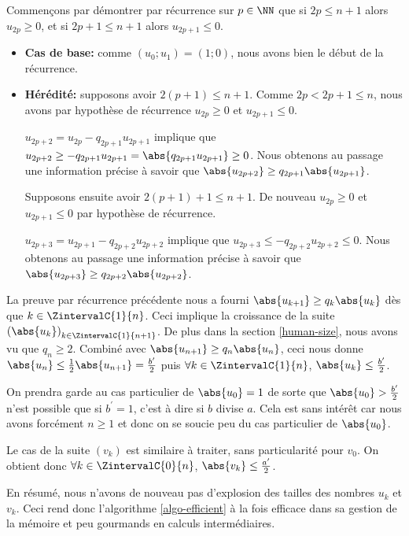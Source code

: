 \medskip


Commençons par démontrer par récurrence sur $p \in \NN$ que si $2p \leq n+1$ alors $u_{2p} \geq 0$, et si $2p + 1 \leq n+1$ alors $u_{2p+1} \leq 0$.

\begin{itemize}[label = \small\textbullet]
	\item \textbf{Cas de base:} comme $(u_0 ; u_1) = (1 ; 0)$, nous avons bien le début de la récurrence.


	\item  \textbf{Hérédité:} supposons avoir $2(p+1) \leq n+1$. Comme $2p < 2p + 1 \leq n$, nous avons par hypothèse de récurrence $u_{2p} \geq 0$ et $u_{2p+1} \leq 0$.
	
	\noindent
	$u_{2p+2} = u_{2p} - q_{2p+1} u_{2p+1}$ implique que 
	$u_{2p+2} \geq - q_{2p+1} u_{2p+1} = \abs{q_{2p+1} u_{2p+1}} \geq 0$.
	Nous obtenons au passage une information précise à savoir que $\abs{u_{2p+2}} \geq q_{2p+1} \abs{u_{2p+1}}$.
	
	
	\medskip
	\noindent
	Supposons ensuite avoir $2(p+1) + 1 \leq n+1$. De nouveau $u_{2p} \geq 0$ et $u_{2p+1} \leq 0$ par hypothèse de récurrence.
	
	\noindent
	$u_{2p+3} = u_{2p+1} - q_{2p+2} u_{2p+2}$ implique que
	$u_{2p+3} \leq - q_{2p+2} u_{2p+2} \leq 0$.
	Nous obtenons au passage une information précise à savoir que $\abs{u_{2p+3}} \geq q_{2p+2} \abs{u_{2p+2}}$.
\end{itemize}


La preuve par récurrence précédente nous a fourni $\abs{u_{k+1}} \geq q_k \abs{u_k}$ dès que $k \in \ZintervalC{1}{n}$. Ceci implique la croissance de la suite $\left( \abs{u_k} \right)_{k \in \ZintervalC{1}{n+1}}$.
De plus dans la section \ref{human-size}, nous avons vu que $q_n \geq 2$. Combiné avec $\abs{u_{n+1}} \geq q_n \abs{u_n}$, ceci nous donne $\abs{u_n} \leq \frac{1}{2} \abs{u_{n+1}} = \frac{b^\prime}{2}$ puis $\forall k \in \ZintervalC{1}{n}$, $\abs{u_k} \leq \frac{b^\prime}{2}$.


\medskip


On prendra garde au cas particulier de $\abs{u_0} = 1$ de sorte que $\abs{u_0} > \frac{b^\prime}{2}$ n'est possible que si $b^\prime = 1$, c'est à dire si $b$ divise $a$. Cela est sans intérêt car nous avons forcément $n \geq 1$ et donc on se soucie peu du cas particulier de $\abs{u_0}$. 


\medskip


Le cas de la suite $(v_k)$ est similaire à traiter, sans particularité pour $v_0$. On obtient donc $\forall k \in \ZintervalC{0}{n}$, $\abs{v_k} \leq \frac{a^\prime}{2}$.


\medskip


En résumé, nous n'avons de nouveau pas d'explosion des tailles des nombres $u_k$ et $v_k$. Ceci rend donc l'algorithme \ref{algo-efficient} à la fois efficace dans sa gestion de la mémoire et peu gourmands en calculs intermédiaires.